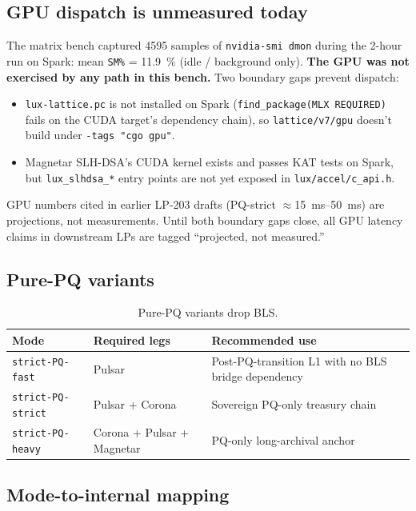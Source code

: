 \subsection{GPU dispatch is unmeasured today}

The matrix bench captured \num{4595} samples of \texttt{nvidia-smi dmon}
during the 2-hour run on Spark: mean \texttt{SM\%} = \SI{11.9}{\percent}
(idle / background only). \textbf{The GPU was not exercised by any
path in this bench.} Two boundary gaps prevent dispatch:

\begin{itemize}[leftmargin=2em,nosep]
\item \texttt{lux-lattice.pc} is not installed on Spark
  (\texttt{find\_package(MLX REQUIRED)} fails on the CUDA target's
  dependency chain), so \texttt{lattice/v7/gpu} doesn't build under
  \texttt{-tags "cgo gpu"}.
\item Magnetar SLH-DSA's CUDA kernel exists and passes KAT tests on
  Spark, but \texttt{lux\_slhdsa\_*} entry points are not yet exposed
  in \texttt{lux/accel/c\_api.h}.
\end{itemize}

GPU numbers cited in earlier LP-203 drafts (PQ-strict
$\approx$\SI{15}{ms}--\SI{50}{ms}) are projections, not measurements.
Until both boundary gaps close, all GPU latency claims in downstream
LPs are tagged ``projected, not measured.''

\subsection{Pure-PQ variants}

\begin{table}[h]
\centering
\small
\begin{tabular}{@{}lp{4cm}p{6cm}@{}}
\toprule
\textbf{Mode} & \textbf{Required legs} & \textbf{Recommended use} \\
\midrule
\texttt{strict-PQ-fast} & Pulsar & Post-PQ-transition L1 with no BLS bridge dependency \\
\texttt{strict-PQ-strict} & Pulsar + Corona & Sovereign PQ-only treasury chain \\
\texttt{strict-PQ-heavy} & Corona + Pulsar + Magnetar & PQ-only long-archival anchor \\
\bottomrule
\end{tabular}
\caption{Pure-PQ variants drop BLS.}
\label{tab:pure-pq}
\end{table}

\subsection{Mode-to-internal mapping}


